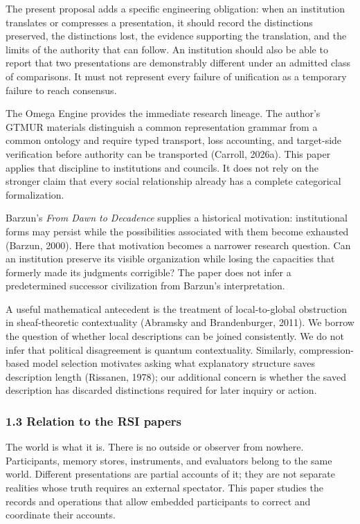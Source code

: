 \documentclass[
  10pt,
]{article}
\begin{document}
The present proposal adds a specific engineering obligation: when an institution translates or compresses a presentation, it should record the distinctions preserved, the distinctions lost, the evidence supporting the translation, and the limits of the authority that can follow. An institution should also be able to report that two presentations are demonstrably different under an admitted class of comparisons. It must not represent every failure of unification as a temporary failure to reach consensus.

The Omega Engine provides the immediate research lineage. The author's GTMUR materials distinguish a common representation grammar from a common ontology and require typed transport, loss accounting, and target-side verification before authority can be transported (Carroll, 2026a). This paper applies that discipline to institutions and councils. It does not rely on the stronger claim that every social relationship already has a complete categorical formalization.

Barzun's \emph{From Dawn to Decadence} supplies a historical motivation: institutional forms may persist while the possibilities associated with them become exhausted (Barzun, 2000). Here that motivation becomes a narrower research question. Can an institution preserve its visible organization while losing the capacities that formerly made its judgments corrigible? The paper does not infer a predetermined successor civilization from Barzun's interpretation.

A useful mathematical antecedent is the treatment of local-to-global obstruction in sheaf-theoretic contextuality (Abramsky and Brandenburger, 2011). We borrow the question of whether local descriptions can be joined consistently. We do not infer that political disagreement is quantum contextuality. Similarly, compression-based model selection motivates asking what explanatory structure saves description length (Rissanen, 1978); our additional concern is whether the saved description has discarded distinctions required for later inquiry or action.

\subsubsection{1.3 Relation to the RSI papers}\label{relation-to-the-rsi-papers}

The world is what it is. There is no outside or observer from nowhere. Participants, memory stores, instruments, and evaluators belong to the same world. Different presentations are partial accounts of it; they are not separate realities whose truth requires an external spectator. This paper studies the records and operations that allow embedded participants to correct and coordinate their accounts.
\end{document}

